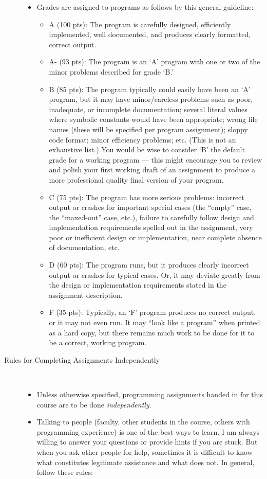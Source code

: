 \documentclass [letterpaper,11pt]{article}
\begin{document}
\begin{description}
\begin{itemize}
\item Grades are assigned to programs as follows by this general guideline:
	\begin{itemize}
	\item 	A (100 pts): The program is carefully designed, efficiently implemented, well documented, and
produces clearly formatted, correct output. 
	\item 	A- (93 pts): The program is an `A' program with one or two of the minor problems described for
grade `B.' 
	\item	B (85 pts): The program typically could easily have been an `A' program, but it may have
minor/careless problems such as poor, inadequate, or incomplete documentation; several literal values where symbolic constants would have been appropriate; wrong file names (these will be specified per program assignment); sloppy code format; minor efficiency problems; etc. (This is not an exhaustive list.) You would be wise to consider `B' the default grade for a working program --- this might encourage you to review and polish your first working draft of an assignment to produce a more professional quality final version of your program.
\item C (75 pts): The program has more serious problems: incorrect output or crashes for important special cases (the ``empty'' case, the ``maxed-out'' case, etc.), failure to carefully follow design and implementation requirements spelled out in the assignment, very poor or inefficient design or implementation, near complete absence of documentation, etc.
\item 	D (60 pts): The program runs, but it produces clearly incorrect output or crashes for typical cases. Or, it may deviate greatly from the design or implementation requirements stated in the assignment description.
\item F (35 pts): Typically, an `F' program produces no correct output, or it may not even run. It may ``look like a program'' when printed as a hard copy, but there remains much work to be done for it to be a correct, working program.
\end{itemize}
\end{itemize}

\item[Rules for Completing Assignments Independently]\
\begin{itemize}
        \item Unless otherwise specified, programming assignments handed in for this course are to be done \emph{independently}.  
        \item Talking to people (faculty, other students in the course, others with programming experience) is one of the best ways to learn.  I am always willing to answer your questions or provide hints if you are stuck.  But when you ask other people for help, sometimes
        it is difficult to know what constitutes legitimate assistance and what does not.  In general, follow these rules:
        

\end{itemize}
\end{description}
\end{document}

